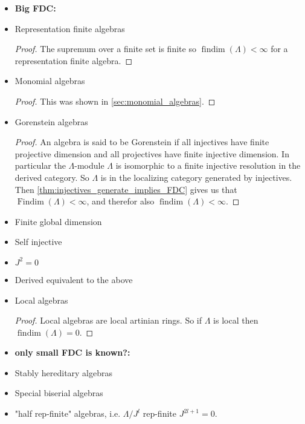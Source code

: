 \documentclass[11pt, a4paper, english]{article}
\theoremstyle{definition}
\DeclareMathOperator{\findim}{findim}
\DeclareMathOperator{\Findim}{Findim}
\begin{document}
\begin{itemize}
	\item \textbf{Big FDC:}
	\item Representation finite algebras
	\begin{proof}
		The supremum over a finite set is finite so $\findim(\Lambda) < \infty$ for a representation finite algebra.
	\end{proof}
	\item Monomial algebras
	\begin{proof}
		This was shown in \cref{sec:monomial_algebras}.
	\end{proof}
	\item Gorenstein algebras
	\begin{proof}
		An algebra is said to be Gorenstein if all injectives have finite projective dimension and all projectives have finite injective dimension. In particular the $\Lambda$-module $\Lambda$ is isomorphic to a finite injective resolution in the derived category. So $\Lambda$ is in the localizing category generated by injectives. Then \cref{thm:injectives_generate_implies_FDC} gives us that $\Findim(\Lambda) < \infty$, and therefor also $\findim(\Lambda) < \infty$.
	\end{proof}
	\item Finite global dimension
	\item Self injective
	\item $J^2 = 0$
	\item Derived equivalent to the above
	\item Local algebras
	\begin{proof}
		Local algebras are local artinian rings. So if $\Lambda$ is local then $\findim(\Lambda)=0$.
	\end{proof}
	\item \textbf{only small FDC is known?:}
	\item Stably hereditary algebras
	\item Special biserial algebras
	\item "half rep-finite" algebras, i.e. $\Lambda/J^l$ rep-finite $J^{2l+1}=0$.
\end{itemize}
\end{document}
